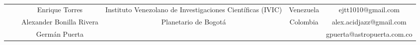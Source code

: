 \begin{table}[H]
{\begin{tabular}{cccccc}
\multicolumn{1}{c|}{} & \multicolumn{1}{c|}{} & \multicolumn{1}{c|}{Enrique Torres} & \multicolumn{1}{c|}{Instituto Venezolano de Investigaciones Científicas (IVIC)} & \multicolumn{1}{c|}{Venezuela} & \multicolumn{1}{c|}{ejtt1010@gmail.com} \\ \cline{3-6} 
\multicolumn{1}{c|}{} & \multicolumn{1}{c|}{} & \multicolumn{1}{c|}{Alexander Bonilla Rivera} & \multicolumn{1}{c|}{Planetario de Bogotá} & \multicolumn{1}{c|}{Colombia} & \multicolumn{1}{c|}{alex.acidjazz@gmail.com} \\ \cline{3-6} 
\multicolumn{1}{c|}{} & \multicolumn{1}{c|}{} & \multicolumn{1}{c|}{Germán Puerta} & \multicolumn{1}{c|}{} & \multicolumn{1}{c|}{} & \multicolumn{1}{c|}{gpuerta@astropuerta.com.co}
\\ \cline{2-6} 
\end{tabular}
}
\caption{}
\label{tab:my-table}
\end{table}



